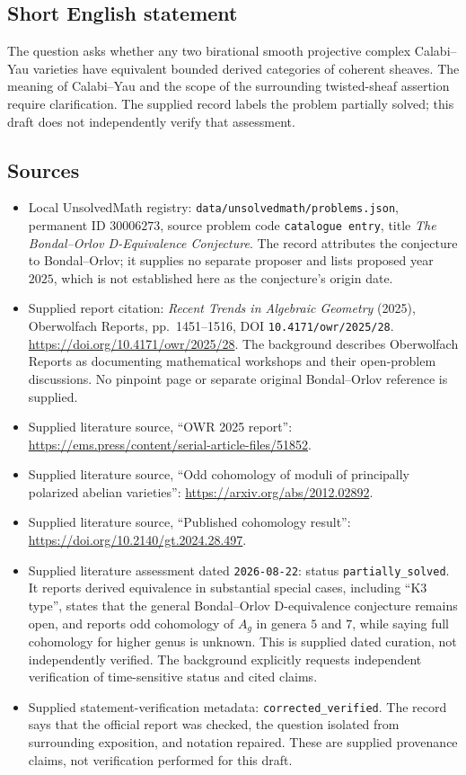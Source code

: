\documentclass[11pt]{article}
\begin{document}
\subsection{Short English statement}
The question asks whether any two birational smooth projective complex Calabi--Yau varieties have equivalent bounded derived categories of coherent sheaves. The meaning of Calabi--Yau and the scope of the surrounding twisted-sheaf assertion require clarification. The supplied record labels the problem partially solved; this draft does not independently verify that assessment.
\subsection{Sources}
\begin{itemize}
\item Local UnsolvedMath registry: \texttt{data/unsolvedmath/problems.json}, permanent ID \(30006273\), source problem code \texttt{catalogue entry}, title \emph{The Bondal--Orlov D-Equivalence Conjecture}. The record attributes the conjecture to Bondal--Orlov; it supplies no separate proposer and lists proposed year \(2025\), which is not established here as the conjecture's origin date.
\item Supplied report citation: \emph{Recent Trends in Algebraic Geometry} (2025), Oberwolfach Reports, pp.\ 1451--1516, DOI \texttt{10.4171/owr/2025/28}. \url{https://doi.org/10.4171/owr/2025/28}. The background describes Oberwolfach Reports as documenting mathematical workshops and their open-problem discussions. No pinpoint page or separate original Bondal--Orlov reference is supplied.
\item Supplied literature source, ``OWR 2025 report'': \url{https://ems.press/content/serial-article-files/51852}.
\item Supplied literature source, ``Odd cohomology of moduli of principally polarized abelian varieties'': \url{https://arxiv.org/abs/2012.02892}.
\item Supplied literature source, ``Published cohomology result'': \url{https://doi.org/10.2140/gt.2024.28.497}.
\item Supplied literature assessment dated \texttt{2026-08-22}: status \texttt{partially\_solved}. It reports derived equivalence in substantial special cases, including ``K3 type'', states that the general Bondal--Orlov D-equivalence conjecture remains open, and reports odd cohomology of \(A_g\) in genera \(5\) and \(7\), while saying full cohomology for higher genus is unknown. This is supplied dated curation, not independently verified. The background explicitly requests independent verification of time-sensitive status and cited claims.
\item Supplied statement-verification metadata: \texttt{corrected\_verified}. The record says that the official report was checked, the question isolated from surrounding exposition, and notation repaired. These are supplied provenance claims, not verification performed for this draft.
\end{itemize}
\end{document}
